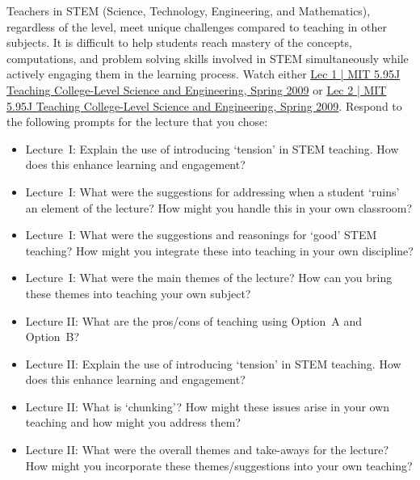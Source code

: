 \documentclass[11pt,letterpaper]{article}
\begin{document}

Teachers in STEM (Science, Technology, Engineering, and Mathematics), regardless of the level, meet unique challenges compared to teaching in other subjects. It is difficult to help students reach mastery of the concepts, computations, and problem solving skills involved in STEM simultaneously while actively engaging them in the learning process. Watch either \href{https://www.youtube.com/watch?v=wy-LqFDwMuM&list=PLB1304385546D6F86&index=2&ab_channel=MITOpenCourseWare}{Lec 1 | MIT 5.95J Teaching College-Level Science and Engineering, Spring 2009} or \href{https://www.youtube.com/watch?v=gyboshu425k&list=PLB1304385546D6F86&index=4&ab_channel=MITOpenCourseWare}{Lec 2 | MIT 5.95J Teaching College-Level Science and Engineering, Spring 2009}. Respond to the following prompts for the lecture that you chose:
	\begin{itemize}
	\item Lecture~I: Explain the use of introducing `tension' in STEM teaching. How does this enhance learning and engagement?
	\item Lecture~I: What were the suggestions for addressing when a student `ruins' an element of the lecture? How might you handle this in your own classroom?
	\item Lecture~I: What were the suggestions and reasonings for `good' STEM teaching? How might you integrate these into teaching in your own discipline? 
	\item Lecture~I: What were the main themes of the lecture? How can you bring these themes into teaching your own subject?
	\item Lecture II: What are the pros/cons of teaching using Option~A and Option~B?
	\item Lecture II: Explain the use of introducing `tension' in STEM teaching. How does this enhance learning and engagement?
	\item Lecture II: What is `chunking'? How might these issues arise in your own teaching and how might you address them?
	\item Lecture II: What were the overall themes and take-aways for the lecture? How might you incorporate these themes/suggestions into your own teaching?
	\end{itemize}

\newpage

\phantom{.}
\end{document}

